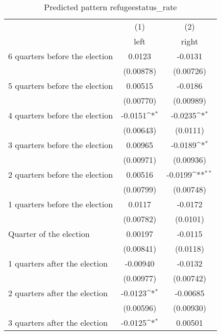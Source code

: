 \begin{table}[htbp]\centering
\def\sym#1{\ifmmode^{#1}\else\(^{#1}\)\fi}
\caption{Predicted pattern refugeestatus\_rate}
\begin{tabular}{l*{2}{c}}
\hline\hline
                    &\multicolumn{1}{c}{(1)}&\multicolumn{1}{c}{(2)}\\
                    &\multicolumn{1}{c}{left}&\multicolumn{1}{c}{right}\\
\hline
 6 quarters before the election&      0.0123         &     -0.0131         \\
                    &   (0.00878)         &   (0.00726)         \\
[1em]
 5 quarters before the election&     0.00515         &     -0.0186         \\
                    &   (0.00770)         &   (0.00989)         \\
[1em]
 4 quarters before the election&     -0.0151\sym{*}  &     -0.0235\sym{*}  \\
                    &   (0.00643)         &    (0.0111)         \\
[1em]
 3 quarters before the election&     0.00965         &     -0.0189\sym{*}  \\
                    &   (0.00971)         &   (0.00936)         \\
[1em]
 2 quarters before the election&     0.00516         &     -0.0199\sym{**} \\
                    &   (0.00799)         &   (0.00748)         \\
[1em]
 1 quarters before the election&      0.0117         &     -0.0172         \\
                    &   (0.00782)         &    (0.0101)         \\
[1em]
Quarter of the election&     0.00197         &     -0.0115         \\
                    &   (0.00841)         &    (0.0118)         \\
[1em]
 1 quarters after the election&    -0.00940         &     -0.0132         \\
                    &   (0.00977)         &   (0.00742)         \\
[1em]
 2 quarters after the election&     -0.0123\sym{*}  &    -0.00685         \\
                    &   (0.00596)         &   (0.00930)         \\
[1em]
 3 quarters after the election&     -0.0125\sym{*}  &     0.00501         \\

\end{tabular}
\end{table}
